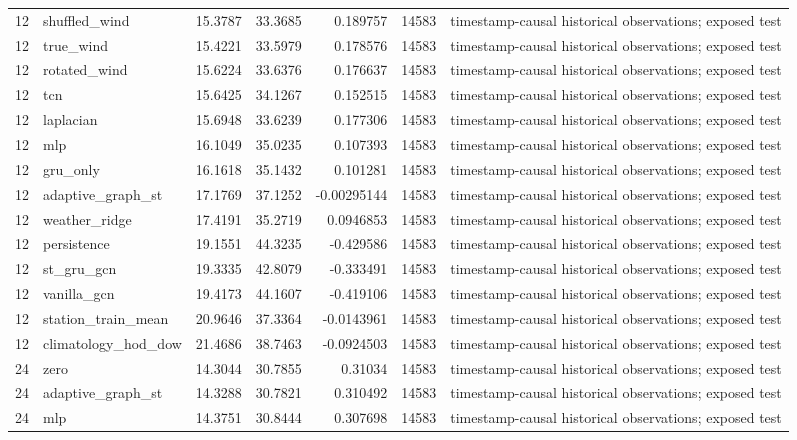 \begin{tabular}{rlrrrrl}
12 & shuffled\_wind & 15.3787 & 33.3685 & 0.189757 & 14583 & timestamp-causal historical observations; exposed test \\
12 & true\_wind & 15.4221 & 33.5979 & 0.178576 & 14583 & timestamp-causal historical observations; exposed test \\
12 & rotated\_wind & 15.6224 & 33.6376 & 0.176637 & 14583 & timestamp-causal historical observations; exposed test \\
12 & tcn & 15.6425 & 34.1267 & 0.152515 & 14583 & timestamp-causal historical observations; exposed test \\
12 & laplacian & 15.6948 & 33.6239 & 0.177306 & 14583 & timestamp-causal historical observations; exposed test \\
12 & mlp & 16.1049 & 35.0235 & 0.107393 & 14583 & timestamp-causal historical observations; exposed test \\
12 & gru\_only & 16.1618 & 35.1432 & 0.101281 & 14583 & timestamp-causal historical observations; exposed test \\
12 & adaptive\_graph\_st & 17.1769 & 37.1252 & -0.00295144 & 14583 & timestamp-causal historical observations; exposed test \\
12 & weather\_ridge & 17.4191 & 35.2719 & 0.0946853 & 14583 & timestamp-causal historical observations; exposed test \\
12 & persistence & 19.1551 & 44.3235 & -0.429586 & 14583 & timestamp-causal historical observations; exposed test \\
12 & st\_gru\_gcn & 19.3335 & 42.8079 & -0.333491 & 14583 & timestamp-causal historical observations; exposed test \\
12 & vanilla\_gcn & 19.4173 & 44.1607 & -0.419106 & 14583 & timestamp-causal historical observations; exposed test \\
12 & station\_train\_mean & 20.9646 & 37.3364 & -0.0143961 & 14583 & timestamp-causal historical observations; exposed test \\
12 & climatology\_hod\_dow & 21.4686 & 38.7463 & -0.0924503 & 14583 & timestamp-causal historical observations; exposed test \\
24 & zero & 14.3044 & 30.7855 & 0.31034 & 14583 & timestamp-causal historical observations; exposed test \\
24 & adaptive\_graph\_st & 14.3288 & 30.7821 & 0.310492 & 14583 & timestamp-causal historical observations; exposed test \\
24 & mlp & 14.3751 & 30.8444 & 0.307698 & 14583 & timestamp-causal historical observations; exposed test \\

\end{tabular}
